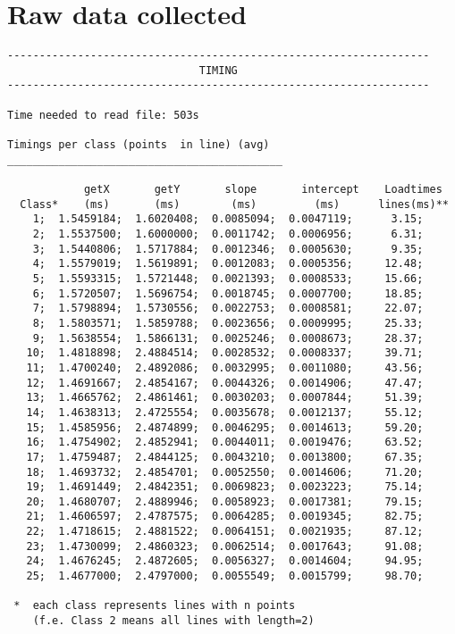 \newpage

\section{Raw data collected}
\begin{verbatim}
------------------------------------------------------------------
                              TIMING                              
------------------------------------------------------------------

Time needed to read file: 503s 
 
Timings per class (points  in line) (avg)
___________________________________________

            getX       getY       slope       intercept    Loadtimes
  Class*    (ms)       (ms)        (ms)         (ms)      lines(ms)** 
    1;  1.5459184;  1.6020408;  0.0085094;  0.0047119;      3.15; 
    2;  1.5537500;  1.6000000;  0.0011742;  0.0006956;      6.31; 
    3;  1.5440806;  1.5717884;  0.0012346;  0.0005630;      9.35; 
    4;  1.5579019;  1.5619891;  0.0012083;  0.0005356;     12.48; 
    5;  1.5593315;  1.5721448;  0.0021393;  0.0008533;     15.66; 
    6;  1.5720507;  1.5696754;  0.0018745;  0.0007700;     18.85; 
    7;  1.5798894;  1.5730556;  0.0022753;  0.0008581;     22.07; 
    8;  1.5803571;  1.5859788;  0.0023656;  0.0009995;     25.33; 
    9;  1.5638554;  1.5866131;  0.0025246;  0.0008673;     28.37; 
   10;  1.4818898;  2.4884514;  0.0028532;  0.0008337;     39.71; 
   11;  1.4700240;  2.4892086;  0.0032995;  0.0011080;     43.56; 
   12;  1.4691667;  2.4854167;  0.0044326;  0.0014906;     47.47; 
   13;  1.4665762;  2.4861461;  0.0030203;  0.0007844;     51.39; 
   14;  1.4638313;  2.4725554;  0.0035678;  0.0012137;     55.12; 
   15;  1.4585956;  2.4874899;  0.0046295;  0.0014613;     59.20; 
   16;  1.4754902;  2.4852941;  0.0044011;  0.0019476;     63.52; 
   17;  1.4759487;  2.4844125;  0.0043210;  0.0013800;     67.35; 
   18;  1.4693732;  2.4854701;  0.0052550;  0.0014606;     71.20; 
   19;  1.4691449;  2.4842351;  0.0069823;  0.0023223;     75.14; 
   20;  1.4680707;  2.4889946;  0.0058923;  0.0017381;     79.15; 
   21;  1.4606597;  2.4787575;  0.0064285;  0.0019345;     82.75; 
   22;  1.4718615;  2.4881522;  0.0064151;  0.0021935;     87.12; 
   23;  1.4730099;  2.4860323;  0.0062514;  0.0017643;     91.08; 
   24;  1.4676245;  2.4872605;  0.0056327;  0.0014604;     94.95; 
   25;  1.4677000;  2.4797000;  0.0055549;  0.0015799;     98.70; 

 *  each class represents lines with n points 
    (f.e. Class 2 means all lines with length=2)


\end{verbatim}
